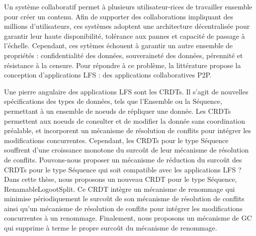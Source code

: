 \begin{ThesisAbstract}
    \vspace{-3cm}
    \begin{FrenchAbstract}
        Un système collaboratif permet à plusieurs utilisateur-rices de travailler ensemble pour créer un contenu.
        Afin de supporter des collaborations impliquant des millions d'utilisateurs, ces systèmes adoptent une architecture décentralisée pour garantir leur haute disponibilité, tolérance aux pannes et capacité de passage à l'échelle.
        Cependant, ces sytèmes échouent à garantir un autre ensemble de propriétés : confidentialité des données, souveraineté des données, pérennité et résistance à la censure.
        Pour répondre à ce problème, la littérature propose la conception d'applications \acf{LFS} : des applications collaboratives \acf{P2P}.

        Une pierre angulaire des applications \ac{LFS} sont les \acfp{CRDT}.
        Il s'agit de nouvelles spécifications des types de données, tels que l'Ensemble ou la Séquence, permettant à un ensemble de noeuds de répliquer une donnée.
        Les \acp{CRDT} permettent aux noeuds de consulter et de modifier la donnée sans coordination préalable, et incorporent un mécanisme de résolution de conflits pour intégrer les modifications concurrentes.
        Cependant, les \acp{CRDT} pour le type Séquence souffrent d'une croissance monotone du surcoût de leur mécanisme de résolution de conflits.
        Pouvons-nous proposer un mécanisme de réduction du surcoût des \acp{CRDT} pour le type Séquence qui soit compatible avec les applications \ac{LFS} ?
        Dans cette thèse, nous proposons un nouveau \ac{CRDT} pour le type Séquence, RenamableLogootSplit.
        Ce \ac{CRDT} intègre un mécanisme de renommage qui minimise périodiquement le surcoût de son mécanisme de résolution de conflits ainsi qu'un mécanisme de résolution de conflits pour intégrer les modifications concurrentes à un renommage.
        Finalement, nous proposons un mécanisme de \acf{GC} qui supprime à terme le propre surcoût du mécanisme de renommage.


\end{FrenchAbstract}
\end{ThesisAbstract}
